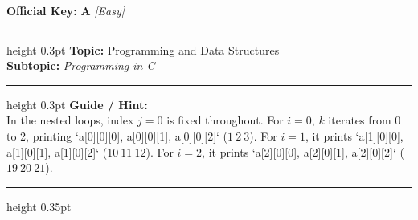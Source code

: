 \documentclass[a4paper,10pt]{article}
\begin{document}
\begin{tcolorbox}
\textbf{Official Key:} \textbf{\large A} \hfill \textit{\small [Easy]}
\vspace{2pt}\hrule height 0.3pt\vspace{3pt}
\textbf{Topic:} Programming and Data Structures \\
\textbf{Subtopic:} \textit{Programming in C}
\vspace{2pt}\hrule height 0.3pt\vspace{3pt}
\textbf{Guide / Hint:} \\
{\small In the nested loops, index $j = 0$ is fixed throughout. For $i = 0$, $k$ iterates from 0 to 2, printing `a[0][0][0], a[0][0][1], a[0][0][2]` ($1\ 2\ 3$). For $i = 1$, it prints `a[1][0][0], a[1][0][1], a[1][0][2]` ($10\ 11\ 12$). For $i = 2$, it prints `a[2][0][0], a[2][0][1], a[2][0][2]` ($19\ 20\ 21$).}

\end{tcolorbox}
\vspace{6pt}\hrule height 0.35pt\vspace{6pt}
\noindent
\end{document}
